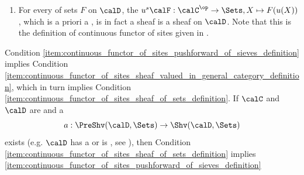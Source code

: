 \begin{proposition}
\begin{enumerate}
    \item \label{item:continuous_functor_of_sites_sheaf_of_sets_definition} For every  of sets $F$ on $\calD$, the  $u^s \calF: \calC^{\op} \to \Sets, X \mapsto F(u(X))$, which is a priori a , is in fact a sheaf is a sheaf on $\calD$. Note that this is the definition of continuous functor of sites given in {\cite[Expos\'e III, D\'efinition 1.1]{SGA4_I}}.
\end{enumerate}
Condition \eqref{item:continuous_functor_of_sites_pushforward_of_sieves_definition} implies Condition \eqref{item:continuous_functor_of_sites_sheaf_valued_in_general_category_definition}, which in turn implies Condition \eqref{item:continuous_functor_of_sites_sheaf_of_sets_definition}. If $\calC$ and $\calD$ are  and a 
\begin{equation} \label{eq:equivalent_conditions_for_continuous_functor_of_sites_proof_sheafification_functor}
a: \PreShv(\calD, \Sets) \to \Shv(\calD, \Sets)
\end{equation}
exists (e.g. $\calD$ has a  or is , see ), then Condition \eqref{item:continuous_functor_of_sites_sheaf_of_sets_definition} implies \eqref{item:continuous_functor_of_sites_pushforward_of_sieves_definition}
\end{proposition}
